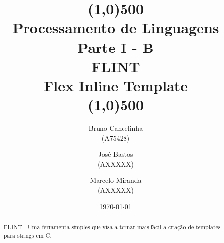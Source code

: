 \documentclass[12pt]{report}
\title{\line(1,0){500}\\Processamento de Linguagens\\ \textbf{Parte I - B}\\FLINT\\Flex Inline Template\\\line(1,0){500}}
\author{Bruno Cancelinha \\(A75428) \and
        José Bastos\\ (AXXXXX) \and 
        Marcelo Miranda\\ (AXXXXX)
        }
\date{\today}
\begin{document}
\maketitle

\tableofcontents


\begin{abstract}
FLINT - Uma ferramenta simples que visa a tornar mais fácil a criação de templates para strings em C.
\end{abstract}


\newpage


\newpage




\newpage


\newpage


\newpage

\appendix


\newpage
\end{document}
